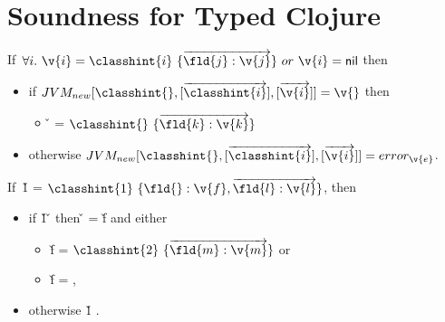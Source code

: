 \section{Soundness for Typed Clojure}

\begin{assumption}[\newjavaliteral] \label{assumption:new}
  If\ $\forall i.\ {\v{i}} = {\classvalue{\classhint{i}}{\overrightarrow{\classfieldpair{\fld{j}} {\v{j}}}}}\ or\ {\v{i}}= {\nil}$
  then
  \begin{itemize}
  \item if $\newjava {\classhint{}}
                {\overrightarrow{\classhint{i}}}
                {\overrightarrow{\v{i}}}
                {\v{}}$
                  then
                  \begin{itemize}
                    \item
                      \v{} = 
                  ${\classvalue{\classhint{}}{\overrightarrow {\classfieldpair{\fld{k}} {\v{k}}}}}$
                  \end{itemize}
  \item
                  otherwise 
        $\newjava {\classhint{}}
                {\overrightarrow{\classhint{i}}}
                {\overrightarrow{\v{i}}}
                {\errorval{\v{e}}}$.
            \end{itemize}
\end{assumption}

\begin{assumption}[\getfieldliteral] \label{assumption:field}
  If\ {\v{1}} = ${\classvalue{\classhint{1}}{{\classfieldpair{\fld{}}{\v{f}}, {\overrightarrow{\classfieldpair{\fld{l}} {\v{l}}}}}}}$,
  then 
  \begin{itemize}
    \item
         if  {\v{1}} {\fld{}} {} {\v{}}
                  then \v{} = \v{f} and either
                  \begin{itemize}
                    \item
                  \v{f} = ${\classvalue{\classhint{2}}{\overrightarrow{\classfieldpair{\fld{m}} {\v{m}}}}}$
                   or 
                    \item
                  \v{f} = \nil,
                  \end{itemize}
    \item
      otherwise  {\v{1}} {\fld{}} {} {}.
  \end{itemize}
\end{assumption}

